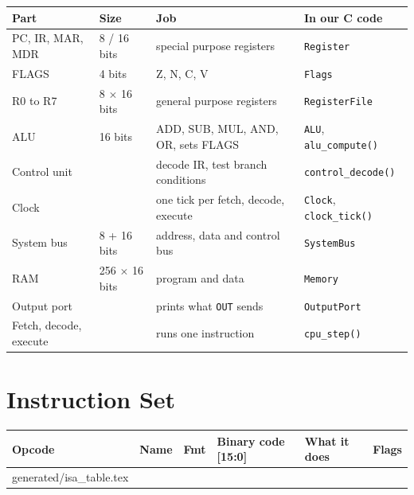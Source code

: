 \documentclass[10pt]{article}
\makeatletter
\newenvironment{tablehere}{\par\vspace{8pt}\noindent\begin{minipage}{\linewidth}\centering\def\@captype{table}}{\end{minipage}\par\vspace{8pt}}
\newenvironment{figurehere}{\par\vspace{8pt}\noindent\begin{minipage}{\linewidth}\centering\def\@captype{figure}}{\end{minipage}\par\vspace{8pt}}
\let\rawinput\@@input
\makeatother
\begin{document}
\begin{tablehere}
\caption{Each CPU part and its C code}
\label{tab:parts}
\small
\setlength{\tabcolsep}{4pt}
\begin{tabularx}{\textwidth}{@{}l l X l@{}}
\toprule
Part & Size & Job & In our C code \\
\midrule
PC, IR, MAR, MDR & 8 / 16 bits & special purpose registers & \texttt{Register} \\
FLAGS & 4 bits & Z, N, C, V & \texttt{Flags} \\
R0 to R7 & 8 $\times$ 16 bits & general purpose registers & \texttt{RegisterFile} \\
ALU & 16 bits & ADD, SUB, MUL, AND, OR, sets FLAGS & \texttt{ALU}, \texttt{alu\_compute()} \\
Control unit & & decode IR, test branch conditions & \texttt{control\_decode()} \\
Clock & & one tick per fetch, decode, execute & \texttt{Clock}, \texttt{clock\_tick()} \\
System bus & 8 + 16 bits & address, data and control bus & \texttt{SystemBus} \\
RAM & 256 $\times$ 16 bits & program and data & \texttt{Memory} \\
Output port & & prints what \texttt{OUT} sends & \texttt{OutputPort} \\
Fetch, decode, execute & & runs one instruction & \texttt{cpu\_step()} \\
\bottomrule
\end{tabularx}
\end{tablehere}

\clearpage
\section{Instruction Set}\label{sec:isa}

\begin{figurehere}
\begin{tikzpicture}

\end{tikzpicture}
\caption{Instruction formats, bit 15 on the left. Blue = opcode, grey = fixed bits.}
\label{fig:formats}
\end{figurehere}

\begin{tablehere}
\caption{Instruction table: every instruction and its binary code. \texttt{d s t r b} = register bits, \texttt{i} = number, \texttt{a} = address, \texttt{c} = condition.}
\label{tab:encoding}
\small
\setlength{\tabcolsep}{4pt}
\begin{tabular}{@{}llc l l l@{}}
\toprule
Opcode & Name & Fmt & Binary code [15:0] & What it does & Flags\\
\midrule
\rawinput generated/isa_table.tex
\bottomrule
\end{tabular}
\end{tablehere}
\end{document}
